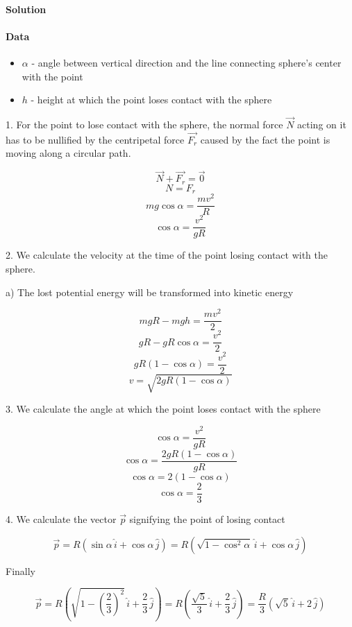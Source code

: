 \documentclass{article}
\begin{document}
\paragraph{Solution}

\paragraph{Data}
\begin{itemize}
    \item $\alpha$ - angle between vertical direction and the line connecting sphere's center with the point
    \item $h$ - height at which the point loses contact with the sphere
\end{itemize}

1. For the point to lose contact with the sphere, the normal force $\vec{N}$ acting on it has to be nullified by the centripetal force $\vec{F_r}$ caused by the fact the point is moving along a circular path.

\[ \vec{N} + \vec{F_r} = \vec{0} \]
\[ N = F_r \]
\[ mg \cos{\alpha} = \frac{mv^2}{R} \]
\[ \cos{\alpha} = \frac{v^2}{gR} \]

2. We calculate the velocity at the time of the point losing contact with the sphere.

a) The lost potential energy will be transformed into kinetic energy

\[ mgR - mgh = \frac{mv^2}{2} \]
\[ gR - gR \cos{\alpha} = \frac{v^2}{2} \]
\[ gR(1 - \cos{\alpha}) = \frac{v^2}{2} \]
\[ v = \sqrt{2gR(1 - \cos{\alpha})} \]

3. We calculate the angle at which the point loses contact with the sphere

\[ \cos{\alpha} = \frac{v^2}{gR} \]
\[ \cos{\alpha} = \frac{2gR(1 - \cos{\alpha})}{gR} \]
\[ \cos{\alpha} = 2(1 - \cos{\alpha}) \]
\[ \cos{\alpha} = \frac{2}{3} \]

4. We calculate the vector $\vec{p}$ signifying the point of losing contact

\[ \vec{p} = R \left( \sin{\alpha} \, \hat{i} + \cos{\alpha} \, \hat{j} \right) = R \left( \sqrt{1 - \cos^2{\alpha}} \, \hat{i} + \cos{\alpha}  \, \hat{j} \right) \]

Finally

\[ \vec{p} = R \left( \sqrt{1 - \left( \frac{2}{3} \right) ^2} \, \hat{i} + \frac{2}{3} \, \hat{j} \right) = R \left( \frac{\sqrt{5}}{3} \, \hat{i} + \frac{2}{3} \, \hat{j} \right) = \frac{R}{3} \left( \sqrt{5} \, \hat{i} + 2 \, \hat{j} \right) \]
\end{document}
